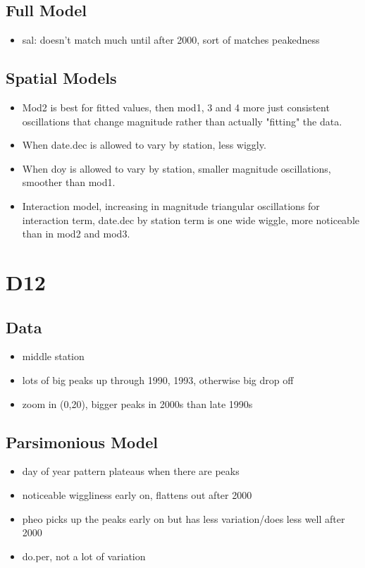 \documentclass[12pt]{amsart}
\begin{document}
\subsection{Full Model}
\begin{itemize}
\item sal: doesn't match much until after 2000, sort of matches peakedness
\end{itemize}

\subsection{Spatial Models}

\begin{itemize}
\item Mod2 is best for fitted values, then mod1, 3 and 4 more just consistent oscillations that change magnitude rather than actually "fitting" the data.
\item When date.dec is allowed to vary by station, less wiggly.
\item When doy is allowed to vary by station, smaller magnitude oscillations, smoother than mod1. 
\item Interaction model, increasing in magnitude triangular oscillations for interaction term, date.dec by station term is one wide wiggle, more noticeable than in mod2 and mod3.
\end{itemize}


\section{D12}
\subsection{Data}
\begin{itemize}
\item middle station
\item lots of big peaks up through 1990, 1993, otherwise big drop off
\item zoom in (0,20), bigger peaks in 2000s than late 1990s
\end{itemize}
\subsection{Parsimonious Model}
\begin{itemize}
\item day of year pattern plateaus when there are peaks
\item noticeable wiggliness early on, flattens out after 2000
\item pheo picks up the peaks early on but has less variation/does less well after 2000
\item do.per, not a lot of variation
\end{itemize}
\end{document}
